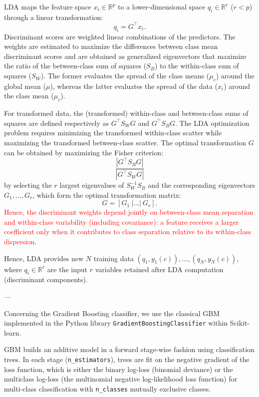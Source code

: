 \documentclass[11pt,a4paper]{article}
\providecommand{\DIFaddtex}[1]{\textcolor{red}{#1}} %
\providecommand{\DIFaddbegin}{} %
\providecommand{\DIFaddend}{} %
\providecommand{\DIFadd}[1]{\texorpdfstring{\DIFaddtex{#1}}{#1}} %
\begin{document}
LDA maps the feature space $x_i \in \mathbb{R}^p$ to a lower-dimensional space $q_i \in \mathbb{R}^r$ ($r < p$) through a linear transformation:
\[
q_i = G^\top x_i.
\]
Discriminant scores are weighted linear combinations of the predictors.  
The weights are estimated to maximize the differences between class mean discriminant scores and are obtained as generalized eigenvectors that maximize the ratio of the between-class sum of squares ($S_B$) to the within-class sum of squares ($S_W$).  
The former evaluates the spread of the class means ($\mu_c$) around the global mean ($\mu$), whereas the latter evaluates the spread of the data ($x_i$) around the class mean ($\mu_c$).

For transformed data, the (transformed) within-class and between-class sums of squares are defined respectively as $G^\top S_W G$ and $G^\top S_B G$.  
The LDA optimization problem requires minimizing the transformed within-class scatter while maximizing the transformed between-class scatter.  
The optimal transformation $G$ can be obtained by maximizing the Fisher criterion:
\[
\frac{|G^\top S_B G|}{|G^\top S_W G|}
\]
by selecting the $r$ largest eigenvalues of $S_W^{-1} S_B$ and the corresponding eigenvectors $G_1, \dots, G_r$, which form the optimal transformation matrix:
\[
G = [G_1 \ | \dots | \ G_r].
\]
 \DIFaddbegin \DIFadd{Hence, the discriminant weights depend jointly on between-class mean separation and within-class variability (including covariance): a feature receives a larger coefficient only when it contributes to class separation relative to its within-class dispersion}\DIFaddend .

Hence, LDA provides new $N$ training data $(q_1, y_1(c)), \dots, (q_N, y_N(c))$, where $q_i \in \mathbb{R}^r$ are the input $r$ variables retained after LDA computation (discriminant components).

---

Concerning the Gradient Boosting classifier, we use the classical GBM \citep{friedman2001greedy} implemented in the Python library \texttt{GradientBoostingClassifier} within Scikit-learn.  

GBM builds an additive model in a forward stage-wise fashion using classification trees.  
In each stage (\texttt{n\_estimators}), trees are fit on the negative gradient of the loss function, which is either the binary log-loss (binomial deviance) or the multiclass log-loss (the multinomial negative log-likelihood loss function) for multi-class classification with \texttt{n\_classes} mutually exclusive classes.
\end{document}
